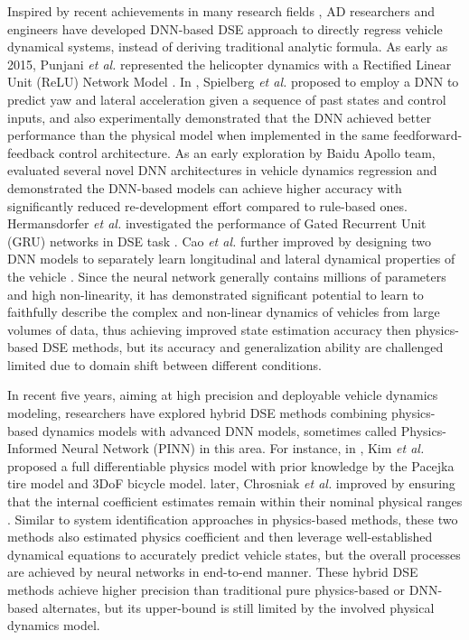 Inspired by recent achievements in many research fields \cite{resnet,vaswani2017attention,poet}, AD researchers and engineers have developed DNN-based DSE approach to directly regress vehicle dynamical systems, instead of deriving traditional analytic formula. 
As early as 2015, Punjani \textit{et al.} represented the helicopter dynamics with a Rectified Linear Unit (ReLU) Network Model \cite{Punjani2015}.
In \cite{spielberg2019neural}, Spielberg \textit{et al.} proposed to employ a DNN to predict yaw and lateral acceleration given a sequence of past states and control inputs, and also experimentally demonstrated that the DNN achieved better performance than the physical model when implemented in the same feedforward-feedback control architecture. 
As an early exploration by Baidu Apollo team, \cite{Xu2019} evaluated several novel DNN architectures in vehicle dynamics regression and demonstrated the DNN-based models can achieve higher accuracy with significantly reduced re-development effort compared to rule-based ones. 
Hermansdorfer \textit{et al.} investigated the performance of Gated Recurrent Unit (GRU) networks in DSE task \cite{Hermansdorfer2020}.
Cao \textit{et al.} further improved by designing two DNN models to separately learn longitudinal and lateral dynamical properties of the vehicle \cite{Cao2021}. 
Since the neural network generally contains millions of parameters and high non-linearity, it has demonstrated significant potential to learn to faithfully describe the complex and non-linear dynamics of vehicles from large volumes of data, thus achieving improved state estimation accuracy then physics-based DSE methods, but its accuracy and generalization ability are challenged limited due to domain shift between different conditions.

In recent five years, aiming at high precision and deployable vehicle dynamics modeling, researchers have explored hybrid DSE methods combining physics-based dynamics models with advanced DNN models, sometimes called Physics-Informed Neural Network (PINN) in this area. 
For instance, in \cite{Kim2022}, Kim \textit{et al.} proposed a full differentiable physics model with prior knowledge by the Pacejka tire model \cite{Pacejka01011992} and 3DoF bicycle model. later, Chrosniak \textit{et al.} improved by ensuring that the internal coefficient estimates remain within their nominal physical ranges \cite{Chrosniak2024}. Similar to system identification approaches in physics-based methods, these two methods also estimated physics coefficient and then leverage well-established dynamical equations to accurately predict vehicle states, but the overall processes are achieved by neural networks in end-to-end manner. These hybrid DSE methods achieve higher precision than traditional pure physics-based or DNN-based alternates, but its upper-bound is still limited by the involved physical dynamics model.

